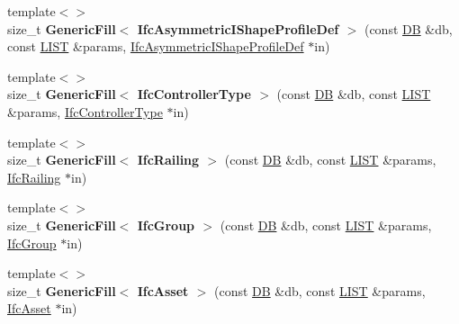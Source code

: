 \begin{DoxyCompactItemize}
\item 
\hypertarget{namespace_assimp_1_1_s_t_e_p_a8456439e566810e36f1138e639d1b0da}{{\footnotesize template$<$$>$ }\\size\+\_\+t {\bfseries Generic\+Fill$<$ Ifc\+Asymmetric\+I\+Shape\+Profile\+Def $>$} (const \hyperlink{class_assimp_1_1_s_t_e_p_1_1_d_b}{D\+B} \&db, const \hyperlink{class_assimp_1_1_s_t_e_p_1_1_e_x_p_r_e_s_s_1_1_l_i_s_t}{L\+I\+S\+T} \&params, \hyperlink{struct_assimp_1_1_i_f_c_1_1_ifc_asymmetric_i_shape_profile_def}{Ifc\+Asymmetric\+I\+Shape\+Profile\+Def} $\ast$in)}\label{namespace_assimp_1_1_s_t_e_p_a8456439e566810e36f1138e639d1b0da}

\item 
\hypertarget{namespace_assimp_1_1_s_t_e_p_a8673fb04f459bcd353a3c419c3c4fa68}{{\footnotesize template$<$$>$ }\\size\+\_\+t {\bfseries Generic\+Fill$<$ Ifc\+Controller\+Type $>$} (const \hyperlink{class_assimp_1_1_s_t_e_p_1_1_d_b}{D\+B} \&db, const \hyperlink{class_assimp_1_1_s_t_e_p_1_1_e_x_p_r_e_s_s_1_1_l_i_s_t}{L\+I\+S\+T} \&params, \hyperlink{struct_assimp_1_1_i_f_c_1_1_ifc_controller_type}{Ifc\+Controller\+Type} $\ast$in)}\label{namespace_assimp_1_1_s_t_e_p_a8673fb04f459bcd353a3c419c3c4fa68}

\item 
\hypertarget{namespace_assimp_1_1_s_t_e_p_ac60242f7dec59ec222cca2e96407dfdc}{{\footnotesize template$<$$>$ }\\size\+\_\+t {\bfseries Generic\+Fill$<$ Ifc\+Railing $>$} (const \hyperlink{class_assimp_1_1_s_t_e_p_1_1_d_b}{D\+B} \&db, const \hyperlink{class_assimp_1_1_s_t_e_p_1_1_e_x_p_r_e_s_s_1_1_l_i_s_t}{L\+I\+S\+T} \&params, \hyperlink{struct_assimp_1_1_i_f_c_1_1_ifc_railing}{Ifc\+Railing} $\ast$in)}\label{namespace_assimp_1_1_s_t_e_p_ac60242f7dec59ec222cca2e96407dfdc}

\item 
\hypertarget{namespace_assimp_1_1_s_t_e_p_a94ef013975662dd083084bda48163daa}{{\footnotesize template$<$$>$ }\\size\+\_\+t {\bfseries Generic\+Fill$<$ Ifc\+Group $>$} (const \hyperlink{class_assimp_1_1_s_t_e_p_1_1_d_b}{D\+B} \&db, const \hyperlink{class_assimp_1_1_s_t_e_p_1_1_e_x_p_r_e_s_s_1_1_l_i_s_t}{L\+I\+S\+T} \&params, \hyperlink{struct_assimp_1_1_i_f_c_1_1_ifc_group}{Ifc\+Group} $\ast$in)}\label{namespace_assimp_1_1_s_t_e_p_a94ef013975662dd083084bda48163daa}

\item 
\hypertarget{namespace_assimp_1_1_s_t_e_p_a872d8667202b208747e468bccf44b1b0}{{\footnotesize template$<$$>$ }\\size\+\_\+t {\bfseries Generic\+Fill$<$ Ifc\+Asset $>$} (const \hyperlink{class_assimp_1_1_s_t_e_p_1_1_d_b}{D\+B} \&db, const \hyperlink{class_assimp_1_1_s_t_e_p_1_1_e_x_p_r_e_s_s_1_1_l_i_s_t}{L\+I\+S\+T} \&params, \hyperlink{struct_assimp_1_1_i_f_c_1_1_ifc_asset}{Ifc\+Asset} $\ast$in)}\label{namespace_assimp_1_1_s_t_e_p_a872d8667202b208747e468bccf44b1b0}


\end{DoxyCompactItemize}
